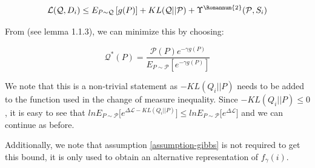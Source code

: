 \documentclass[letterpaper]{article}
\theoremstyle{definition}
\begin{document}
$$ \mathcal{L}(\mathcal{Q}, D_i)\leq E_{P\sim \mathcal{Q}}\left [g(P) \right ] + KL(\mathcal{Q}||\mathcal{P})+\Upsilon^{\text{\Romannum{2}}}(\mathcal{P}, S_i)$$

From \cite{Catoni2007} (see lemma 1.1.3), we can minimize this by choosing:

$$\mathcal{Q}^{*}(P)=\frac{\mathcal{P}(P) e^{-\gamma g(P)}}{E_{P\sim \mathcal{P}} \left [ e^{-\gamma g(P) } \right ]}$$

We note that this is a non-trivial statement as $-KL(Q_i||P)$ needs to be added to the function used in the change of measure inequality. Since $-KL(Q_i||P)\leq 0$, it is easy to see that $lnE_{P\sim \mathcal{P}}\bigl [e^{\Delta \mathcal{L}-KL(Q_i||P)}\bigr ]\leq lnE_{P\sim \mathcal{P}}\bigl [e^{\Delta \mathcal{L}}\bigr ]$ and we can continue as before.

Additionally, we note that assumption \ref{assumption-gibbs} is not required to get this bound, it is only used to obtain an alternative representation of $f_{\gamma}(i)$.








\end{document}

